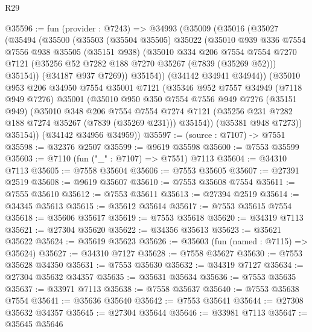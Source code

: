 \begin{lexlean}{R29}
\begin{coremodule}
@35596 := fun (provider : @7243) =>
  @34993
    (@35009
      (@35016
        (@35027
          (@35494
            (@35500
              (@35503
                (@35504 @35505)
                @35022
                (@35010
                  @939
                  @336
                  @7554
                  @7556
                  @938
                  @35505
                  (@35151 @938)
                  (@35010
                    @334
                    @206
                    @7554
                    @7554
                    @7270
                    @7121
                    (@35256 @52 @7282 @188 @7270 @35267 (@7839 (@35269 @52)))
                    @35154))
                (@34187 @937 @7269))
              @35154))
          (@34142 @34941 @34944))
        (@35010
          @953
          @206
          @34950
          @7554
          @35001
          @7121
          (@35346
            @952
            @7557
            @34949
            (@7118 @949 @7276)
            @35001
            (@35010
              @950
              @350
              @7554
              @7556
              @949
              @7276
              (@35151 @949)
              (@35010
                @348
                @206
                @7554
                @7554
                @7274
                @7121
                (@35256 @231 @7282 @188 @7274 @35267 (@7839 (@35269 @231)))
                @35154))
            (@35381 @948 @7273))
          @35154))
      (@34142 @34956 @34959))
@35597 := (source : @7107) -> @7551
@35598 := @32376 @2507
@35599 := @9619 @35598
@35600 := @7553 @35599
@35603 := @7110 (fun ("_" : @7107) => @7551) @7113
@35604 := @34310 @7113
@35605 := @7558 @35604
@35606 := @7553 @35605
@35607 := @27391 @2519
@35608 := @9619 @35607
@35610 := @7553 @35608 @7554
@35611 := @7555 @35610
@35612 := @7553 @35611
@35613 := @27394 @2519
@35614 := @34345 @35613
@35615 := @35612 @35614
@35617 := @7553 @35615 @7554
@35618 := @35606 @35617
@35619 := @7553 @35618
@35620 := @34319 @7113
@35621 := @27304 @35620
@35622 := @34356 @35613
@35623 := @35621 @35622
@35624 := @35619 @35623
@35626 := @35603 (fun (named : @7115) => @35624)
@35627 := @34310 @7127
@35628 := @7558 @35627
@35630 := @7553 @35628 @34350
@35631 := @7553 @35630
@35632 := @34319 @7127
@35634 := @27304 @35632 @34357
@35635 := @35631 @35634
@35636 := @7553 @35635
@35637 := @33971 @7113
@35638 := @7558 @35637
@35640 := @7553 @35638 @7554
@35641 := @35636 @35640
@35642 := @7553 @35641
@35644 := @27308 @35632 @34357
@35645 := @27304 @35644
@35646 := @33981 @7113
@35647 := @35645 @35646

\end{coremodule}
\end{lexlean}
